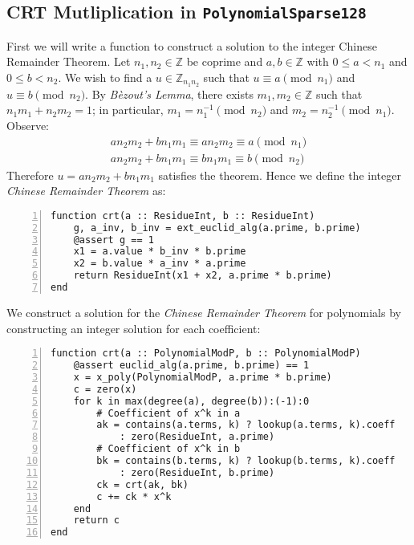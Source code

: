 \documentclass{article}
\theoremstyle{plain}
\numberwithin{theorem}{section}
\numberwithin{example}{section}
\theoremstyle{definition}
\numberwithin{definition}{section}
\begin{document}
\subsection{CRT Mutliplication in \texttt{PolynomialSparse128}}
First we will write a function to construct a solution to the integer Chinese
Remainder Theorem. Let $n_1, n_2 \in \mathbb{Z}$ be coprime and $a, b \in
\mathbb{Z}$ with $0 \leq a < n_1$ and $0 \leq b < n_2$. We wish to find a $u \in
\mathbb{Z}_{n_1n_2}$ such that $u \equiv a \pmod{n_1}$ and $u \equiv b
\pmod{n_2}$. By \emph{B\`ezout's Lemma}, there exists $m_1, m_2 \in \mathbb{Z}$
such that $n_1m_1 + n_2m_2 = 1$; in particular, $m_1 = n_1^{-1} \pmod{n_2}$ and
$m_2 = n_2^{-1} \pmod{n_1}$. Observe:
\begin{gather*}
    an_2m_2 + bn_1m_1 \equiv an_2m_2 \equiv a \pmod{n_1} \\
    an_2m_2 + bn_1m_1 \equiv bn_1m_1 \equiv b \pmod{n_2}
\end{gather*}
Therefore $u = an_2m_2 + bn_1m_1$ satisfies the theorem. Hence we define the
integer \emph{Chinese Remainder Theorem} as:

\begin{codebox}
    \begin{Verbatim}[numbers=left,xleftmargin=5mm]
function crt(a :: ResidueInt, b :: ResidueInt)
    g, a_inv, b_inv = ext_euclid_alg(a.prime, b.prime)
    @assert g == 1
    x1 = a.value * b_inv * b.prime
    x2 = b.value * a_inv * a.prime
    return ResidueInt(x1 + x2, a.prime * b.prime)
end
    \end{Verbatim}
\end{codebox}

We construct a solution for the \emph{Chinese Remainder Theorem} for polynomials
by constructing an integer solution for each coefficient:

\begin{codebox}
    \begin{Verbatim}[numbers=left,xleftmargin=5mm]
function crt(a :: PolynomialModP, b :: PolynomialModP)
    @assert euclid_alg(a.prime, b.prime) == 1
    x = x_poly(PolynomialModP, a.prime * b.prime)
    c = zero(x)
    for k in max(degree(a), degree(b)):(-1):0
        # Coefficient of x^k in a
        ak = contains(a.terms, k) ? lookup(a.terms, k).coeff
            : zero(ResidueInt, a.prime)
        # Coefficient of x^k in b
        bk = contains(b.terms, k) ? lookup(b.terms, k).coeff
            : zero(ResidueInt, b.prime)
        ck = crt(ak, bk)
        c += ck * x^k
    end
    return c
end
    \end{Verbatim}
\end{codebox}
\end{document}
